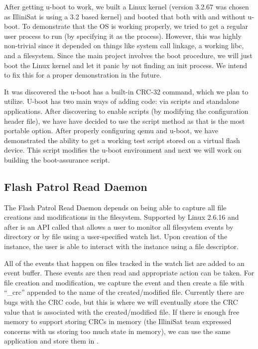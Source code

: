 After getting u-boot to work, we built a Linux kernel (version 3.2.67 was chosen
as IlliniSat is using a 3.2 based kernel) and booted that both with and without 
u-boot.  To demonstrate that the OS is working properly, we tried to get a
regular user process to run (by specifying it as the  process).
However, this was highly non-trivial since it depended on things like system
call linkage, a working libc, and a filesystem.  Since the main project involves
the boot procedure, we will just boot the Linux kernel and let it panic by not
finding an init process. We intend to fix this for a proper demonstration in the
future.

It was discovered the u-boot has a built-in CRC-32 command, which we plan to
utilize. U-boot has two main ways of adding code: via scripts and standalone
applications.  After discovering to enable scripts (by modifying the
configuration header file), we have have decided to use the script method as
that is the most portable option. After properly configuring qemu and u-boot, we
have demonstrated the ability to get a working test script stored on a virtual
flash device.  This script modifies the u-boot environment and next we will work
on building the boot-assurance script.  


\subsection{Flash Patrol Read Daemon}
The Flash Patrol Read Daemon depends on being able to capture all file creations
and modifications in the filesystem. Supported by Linux 2.6.16 and after is an
API called  that allows a user to monitor all filesystem events by
directory or by file using a user-specified watch list. Upon creation of the
 instance, the user is able to interact with the instance using a
file descriptor. 

All of the events that happen on files tracked in the watch list are added to an
 event buffer.  These events are then read and appropriate action
can be taken. For file creation and modification, we capture the event and then
create a file with ``\_crc'' appended to the name of the created/modified file.
Currently there are bugs with the CRC code, but this is where we will eventually
store the CRC value that is associated with the created/modified file.  If there
is enough free memory to support storing CRCs in memory (the IlliniSat team
expressed concerns with us storing too much state in memory), we can use the
same application and store them in .

